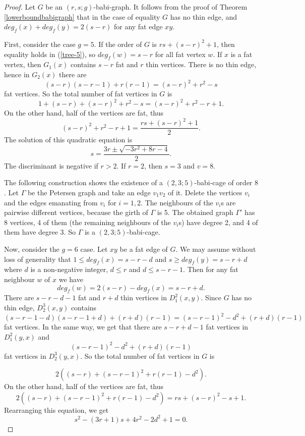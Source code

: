 \documentclass[a4paper,11pt]{article}
\begin{document}
\begin{proof}
Let $G$ be an $(r,s;g)$-babi-graph. 
It follows from the proof of Theorem \ref{lowerboundbabigraph} that in the case of equality
$G$ has no thin edge, and $deg_f(x)+deg_f(y)=2(s-r)$ for any fat edge $xy$. 

First, consider the case $g=5$. If the order of $G$ is $rs+(s-r)^2+1$, then equality holds in 
(\ref{tree-5}), so $deg_f(w)=s-r$ for all fat vertex $w$. If $x$ is a fat vertex, then $G_1(x)$
contains $s-r$ fat and $r$ thin vertices. There is no thin edge, hence in $G_2(x)$ there are 
$$(s-r)(s-r-1)+r(r-1)=(s-r)^2+r^2-s$$
fat vertices. So the total number of fat vertices in $G$ is 
$$1+(s-r)+(s-r)^2+r^2-s=(s-r)^2+r^2-r+1.$$
On the other hand, half of the vertices are fat, thus
$$(s-r)^2+r^2-r+1=\frac{rs+(s-r)^2+1}{2}.$$
The solution of this quadratic equation is
$$s=\frac{3r\pm \sqrt{-3r^2+8r-4}}{2}.$$
The discriminant is negative if $r>2.$ If $r=2$, then $s=3$ and $v=8$.

The following construction shows the existence of a $(2,3;5)$-babi-cage of order $8$.
Let $\Gamma$ be the Petersen graph and take an edge $v_1v_2$ of it. Delete the vertices $v_i$ and the edges emanating from $v_i$ for $i=1,2.$ The neighbours of
the $v_i$s are pairwise different vertices, because the girth of $\Gamma $ is 5. 
The obtained graph $\Gamma '$ has 8 vertices, 4 of them (the
remaining neighbours of the $v_i$s) have degree 2, and 4 of them have degree 3.
So $\Gamma $ is a $(2,3;5)$-babi-cage.

\smallskip
Now, consider the $g=6$ case. Let $xy$ be a fat edge of $G$. We may assume without loss of generality
that $1\leq deg_f(x)=s-r-d$ and $s\geq deg_f(y)=s-r+d$ where $d$ is a non-negative integer, $d\leq r$ and $d\leq s-r-1$. Then for any fat neighbour $w$ of $x$ we have 
$$deg_f(w)=2(s-r)-deg_f(x)=s-r+d.$$
There are $s-r-d-1$ fat and $r+d$ thin vertices in $D_1^2(x,y)$. Since $G$ has no thin edge,
$D_2^3(x,y)$ contains
 $$(s-r-1-d)(s-r-1+d)+(r+d)(r-1)=(s-r-1)^2-d^2+(r+d)(r-1)$$
fat vertices. In the same way, we get that there are $s-r+d-1$ fat vertices in $D_1^2(y,x)$ and 
$$(s-r-1)^2-d^2+(r+d)(r-1)$$ 
fat vertices in $D_2^3(y,x)$. So the total number of fat vertices in $G$ is

$$2\left( (s-r)+(s-r-1)^2+r(r-1)-d^2 \right).$$
On the other hand, half of the vertices are fat, thus
$$2\left( (s-r)+(s-r-1)^2+r(r-1)-d^2 \right)=rs+(s-r)^2-s+1.$$
Rearranging this equation, we get
\begin{equation}
\label{diophantine}
s^2-(3r+1)s+4r^2-2d^2+1=0.
\end{equation}


\end{proof}
\end{document}
